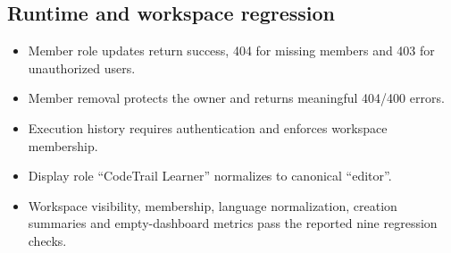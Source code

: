 \documentclass[11pt,a4paper]{article}
\begin{document}
\subsection{Runtime and workspace regression}
\begin{itemize}
    \item Member role updates return success, 404 for missing members and 403 for
    unauthorized users.
    \item Member removal protects the owner and returns meaningful 404/400 errors.
    \item Execution history requires authentication and enforces workspace membership.
    \item Display role ``CodeTrail Learner'' normalizes to canonical ``editor''.
    \item Workspace visibility, membership, language normalization, creation summaries
    and empty-dashboard metrics pass the reported nine regression checks.
\end{itemize}
\end{document}
